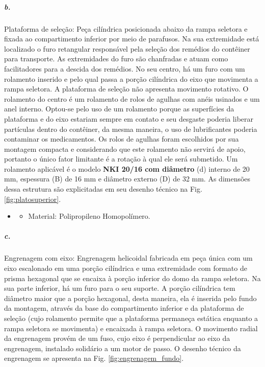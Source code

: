     
    \subparagraph*{b.} \label{retorno_platosuperior}
    Plataforma de seleção: Peça cilíndrica posicionada abaixo da rampa seletora e fixada ao compartimento inferior por meio de parafusos. Na sua extremidade está localizado o furo retangular responsável pela seleção dos remédios do contêiner para transporte. As extremidades do furo são chanfradas e atuam como facilitadores para a descida dos remédios. No seu centro, há um furo com um rolamento inserido e pelo qual passa a porção cilíndrica do eixo que movimenta a rampa seletora. A plataforma de seleção não apresenta movimento rotativo. 
    O rolamento do centro é um rolamento de rolos de agulhas com anéis usinados e um anel interno. Optou-se pelo uso de um rolamento porque as superfícies da plataforma e do eixo estariam sempre em contato e seu desgaste poderia liberar partículas dentro do contêiner, da mesma maneira, o uso de lubrificantes poderia contaminar os medicamentos. Os rolos de agulhas foram escolhidos por sua montagem compacta e considerando que este rolamento não servirá de apoio, portanto o único fator limitante é a rotação à qual ele será submetido. Um rolamento aplicável é o modelo \textbf{NKI 20/16 com diâmetro} (d) interno de 20 mm, espessura (B) de 16 mm e diâmetro externo (D) de 32 mm.
    As dimensões dessa estrutura são explicitadas em seu desenho técnico na Fig. \ref{fig:platosuperior}.
    
    \begin{itemize}
   \item[]
   \begin{itemize}
       \item  Material: Polipropileno Homopolímero.
   \end{itemize}
   \end{itemize}
   
    
    \subparagraph*{c.} \label{retorno_engrenagem_fundo}
    Engrenagem com eixo: Engrenagem helicoidal fabricada em peça única com um eixo escalonado em uma porção cilíndrica e uma extremidade com formato de prisma hexagonal que se encaixa à porção inferior do domo da rampa seletora. Na sua parte inferior, há um furo para o seu suporte.
    A porção cilíndrica tem diâmetro maior que a porção hexagonal, desta maneira, ela é inserida pelo fundo da montagem, através da base do compartimento inferior e da plataforma de seleção (cujo rolamento permite que a plataforma permaneça estática enquanto a rampa seletora se movimenta) e encaixada à rampa seletora. O movimento radial da engrenagem provém de um fuso, cujo eixo é perpendicular ao eixo da engrenagem, instalado solidário a um motor de passo. O desenho técnico da engrenagem se apresenta na Fig. \ref{fig:engrenagem_fundo}.
    
